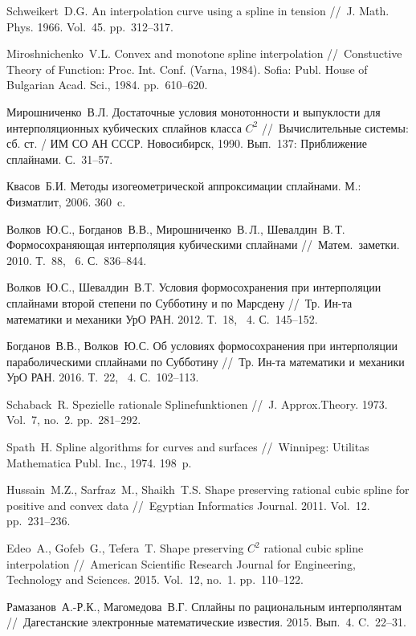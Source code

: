 \begin{thebibliography}{111}


Schweikert~D.G. An interpolation curve using a spline in tension
//~J. Math. Phys. 1966. Vol.~45. pp.~312--317.


Miroshnichenko~V.L. Convex and monotone spline interpolation
//~Constuctive Theory of Function: Proc. Int. Conf. (Varna, 1984).  Sofia:
Publ. House of Bulgarian Acad. Sci., 1984. pp.~610--620.

Мирошниченко~В.Л. Достаточные условия монотонности и выпуклости
для интерполяционных кубических сплайнов класса $C^2$
//~Вычислительные системы: сб. ст. / ИМ СО АН СССР.
Новосибирск, 1990. Вып.~137: Приближение сплайнами. С.~31--57.

Квасов~Б.И. Методы изогеометрической аппроксимации сплайнами.
 М.: Физматлит, 2006. 360~c.

Волков~Ю.С., Богданов~В.В., Мирошниченко~В.\,Л., Шевалдин~В.\,Т.
Формосохраняющая интерполяция кубическими сплайнами //~Матем.~заметки. 2010. Т.~88, \No~6. С.~836--844.

Волков~Ю.С., Шевалдин~В.Т.
Условия формосохранения при интерполяции сплайнами второй степени по Субботину и по Марсдену
//~Тр. Ин-та математики и механики УрО РАН. 2012. Т.~18, \No~4. С.~145--152.

Богданов~В.В., Волков~Ю.С.
Об условиях формосохранения при интерполяции параболическими сплайнами по Субботину
//~Тр. Ин-та математики и механики УрО РАН. 2016. Т.~22, \No~4. С.~102--113.

Schaback~R. Spezielle rationale Splinefunktionen
//~J. Approx.Theory.  1973. Vol.~7, no.~2. pp.~281--292.

Spath~H. Spline algorithms for curves and surfaces
//~Winnipeg: Utilitas Mathematica Publ. Inc., 1974. 198~p.

Hussain~M.Z., Sarfraz~M., Shaikh~T.S.
Shape preserving rational cubic spline for positive and convex data
//~Egyptian Informatics Journal. 2011. Vol.~12. pp.~231--236.

Edeo~A., Gofeb~G., Tefera~T. Shape preserving $C^2$ rational
 cubic spline interpolation //~American Scientific Research Journal for Engineering, Technology and Sciences.
 2015. Vol.~12, no.~1. pp.~110--122.

Рамазанов~А.-Р.К., Магомедова~В.Г.  Сплайны по рациональным интерполянтам
//~Дагестанские электронные математические известия. 2015. Вып.~4. C.~22--31.



\end{thebibliography}
